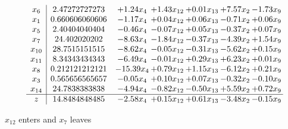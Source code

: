 \documentclass[9pt]{article}
\begin{document}
 \[\begin{array}{c| c c@{\hskip 2pt} c@{\hskip 2pt} c@{\hskip 2pt} c@{\hskip 2pt} c@{\hskip 2pt} }
 x_{6}   &  2.47272727273 & +  1.24 x_{4} & +  1.43 x_{12} & +  0.01 x_{13} & +  7.57 x_{2} & -1.73 x_{9}\\
 x_{1}   &  0.660606060606 & -1.17 x_{4} & +  0.04 x_{12} & +  0.06 x_{13} & -0.71 x_{2} & +  0.06 x_{9}\\
 x_{5}   &  2.40404040404 & -0.46 x_{4} & -0.07 x_{12} & +  0.05 x_{13} & -0.37 x_{2} & +  0.07 x_{9}\\
 x_{7}   &  24.402020202 & -8.63 x_{4} & -1.84 x_{12} & -0.37 x_{13} & -4.39 x_{2} & +  1.54 x_{9}\\
 x_{10}   &  28.7515151515 & -8.62 x_{4} & -0.05 x_{12} & -0.31 x_{13} & -5.62 x_{2} & +  0.15 x_{9}\\
 x_{11}   &  8.34343434343 & -6.49 x_{4} & -0.01 x_{12} & +  0.29 x_{13} & +  6.23 x_{2} & +  0.01 x_{9}\\
 x_{8}   &  0.212121212121 & -15.39 x_{4} & +  0.79 x_{12} & +  1.15 x_{13} & -6.12 x_{2} & +  0.21 x_{9}\\
 x_{3}   &  0.565656565657 & -0.05 x_{4} & +  0.10 x_{12} & +  0.07 x_{13} & -0.32 x_{2} & -0.10 x_{9}\\
 x_{14}   &  24.7838383838 & -4.94 x_{4} & -0.82 x_{12} & -0.50 x_{13} & +  5.59 x_{2} & +  0.72 x_{9}\\
\hline
z    &  14.8484848485 & -2.58 x_{4} & +  0.15 x_{12} & +  0.61 x_{13} & -3.48 x_{2} & -0.15 x_{9}\\
\end{array}\]


 $ x_{12} $ enters and $ x_{7} $ leaves 
\end{document}
